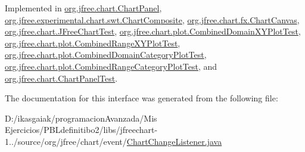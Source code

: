 Implemented in \mbox{\hyperlink{classorg_1_1jfree_1_1chart_1_1_chart_panel_a872d3011111149268824719983f616c7}{org.\+jfree.\+chart.\+Chart\+Panel}}, \mbox{\hyperlink{classorg_1_1jfree_1_1experimental_1_1chart_1_1swt_1_1_chart_composite_a356b3e52ea0215e75ea2d9a248fd25ee}{org.\+jfree.\+experimental.\+chart.\+swt.\+Chart\+Composite}}, \mbox{\hyperlink{classorg_1_1jfree_1_1chart_1_1fx_1_1_chart_canvas_aada7d718977d4674bdf59d0e7c2f03e8}{org.\+jfree.\+chart.\+fx.\+Chart\+Canvas}}, \mbox{\hyperlink{classorg_1_1jfree_1_1chart_1_1_j_free_chart_test_a97b21a47b203de35fe1496bf28fdfc75}{org.\+jfree.\+chart.\+J\+Free\+Chart\+Test}}, \mbox{\hyperlink{classorg_1_1jfree_1_1chart_1_1plot_1_1_combined_domain_x_y_plot_test_a4764082ee6dcd2f113379062abafafa3}{org.\+jfree.\+chart.\+plot.\+Combined\+Domain\+X\+Y\+Plot\+Test}}, \mbox{\hyperlink{classorg_1_1jfree_1_1chart_1_1plot_1_1_combined_range_x_y_plot_test_a045ab62222d4078e53b34751458e27de}{org.\+jfree.\+chart.\+plot.\+Combined\+Range\+X\+Y\+Plot\+Test}}, \mbox{\hyperlink{classorg_1_1jfree_1_1chart_1_1plot_1_1_combined_domain_category_plot_test_a70a89952544593432dd1e2f02a9b7973}{org.\+jfree.\+chart.\+plot.\+Combined\+Domain\+Category\+Plot\+Test}}, \mbox{\hyperlink{classorg_1_1jfree_1_1chart_1_1plot_1_1_combined_range_category_plot_test_a57ff906ebc7c7d643edfcdd1289a8e03}{org.\+jfree.\+chart.\+plot.\+Combined\+Range\+Category\+Plot\+Test}}, and \mbox{\hyperlink{classorg_1_1jfree_1_1chart_1_1_chart_panel_test_a2adbf5693b2052053d2737583c146f4d}{org.\+jfree.\+chart.\+Chart\+Panel\+Test}}.



The documentation for this interface was generated from the following file\+:\begin{DoxyCompactItemize}
\item 
D\+:/ikasgaiak/programacion\+Avanzada/\+Mis Ejercicios/\+P\+B\+Ldefinitibo2/libs/jfreechart-\/1../source/org/jfree/chart/event/\mbox{\hyperlink{_chart_change_listener_8java}{Chart\+Change\+Listener.\+java}}\end{DoxyCompactItemize}
